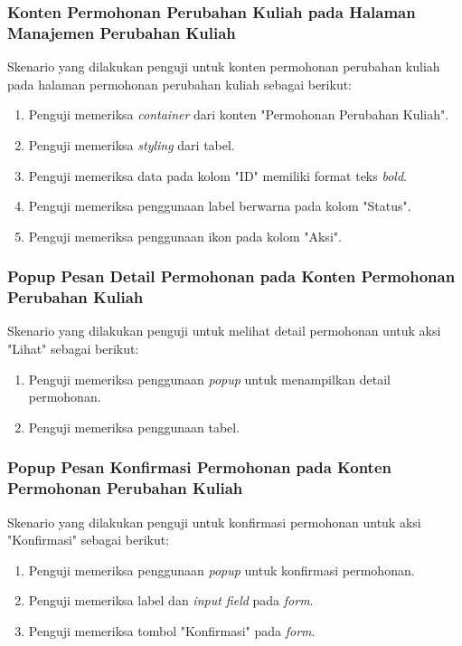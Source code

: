\subsubsection{Konten Permohonan Perubahan Kuliah pada Halaman Manajemen Perubahan Kuliah}
Skenario yang dilakukan penguji untuk konten permohonan perubahan kuliah pada halaman permohonan perubahan kuliah sebagai berikut:
\begin{enumerate}
	\item Penguji memeriksa \textit{container} dari konten "Permohonan Perubahan Kuliah".
	\item Penguji memeriksa \textit{styling} dari tabel.	
	\item Penguji memeriksa data pada kolom "ID" memiliki format teks \textit{bold}.
	\item Penguji memeriksa penggunaan label berwarna pada kolom "Status".			
	\item Penguji memeriksa penggunaan ikon pada kolom "Aksi".
\end{enumerate}

\subsubsection{Popup Pesan Detail Permohonan pada Konten Permohonan Perubahan Kuliah}
Skenario yang dilakukan penguji untuk melihat detail permohonan untuk aksi "Lihat" sebagai berikut:
\begin{enumerate}
	\item Penguji memeriksa penggunaan \textit{popup} untuk menampilkan detail permohonan.	
	\item Penguji memeriksa penggunaan tabel.	
\end{enumerate}

\subsubsection{Popup Pesan Konfirmasi Permohonan pada Konten Permohonan Perubahan Kuliah}
Skenario yang dilakukan penguji untuk konfirmasi permohonan untuk aksi "Konfirmasi" sebagai berikut:
\begin{enumerate}
	\item Penguji memeriksa penggunaan \textit{popup} untuk konfirmasi permohonan.
	\item Penguji memeriksa label dan \textit{input field} pada \textit{form}.
	\item Penguji memeriksa tombol "Konfirmasi" pada \textit{form}.	
\end{enumerate}


